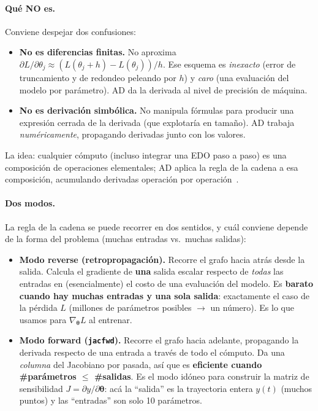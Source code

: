 \documentclass[11pt,a4paper]{article}
\newcommand{\thetavec}{\bm{\theta}}
\begin{document}
\paragraph{Qué NO es.} Conviene despejar dos confusiones:
\begin{itemize}[nosep]
  \item \textbf{No es diferencias finitas.} No aproxima $\partial L/\partial\theta_j \approx (L(\theta_j+h)-L(\theta_j))/h$. Ese esquema es \emph{inexacto} (error de truncamiento y de redondeo peleando por $h$) y \emph{caro} (una evaluación del modelo por parámetro). AD da la derivada al nivel de precisión de máquina.
  \item \textbf{No es derivación simbólica.} No manipula fórmulas para producir una expresión cerrada de la derivada (que explotaría en tamaño). AD trabaja \emph{numéricamente}, propagando derivadas junto con los valores.
\end{itemize}
La idea: cualquier cómputo (incluso integrar una EDO paso a paso) es una composición de operaciones elementales; AD aplica la regla de la cadena a esa composición, acumulando derivadas operación por operación~\cite{baydin2018}.

\paragraph{Dos modos.} La regla de la cadena se puede recorrer en dos sentidos, y cuál conviene depende de la forma del problema (muchas entradas vs.\ muchas salidas):
\begin{itemize}[nosep]
  \item \textbf{Modo reverse (retropropagación).} Recorre el grafo hacia atrás desde la salida. Calcula el gradiente de \textbf{una} salida escalar respecto de \emph{todas} las entradas en (esencialmente) el costo de una evaluación del modelo. Es \textbf{barato cuando hay muchas entradas y una sola salida}: exactamente el caso de la pérdida $L$ (millones de parámetros posibles $\to$ un número). Es lo que usamos para $\nabla_{\thetavec}L$ al entrenar.
  \item \textbf{Modo forward (\texttt{jacfwd}).} Recorre el grafo hacia adelante, propagando la derivada respecto de una entrada a través de todo el cómputo. Da una \emph{columna} del Jacobiano por pasada, así que es \textbf{eficiente cuando \#parámetros $\le$ \#salidas}. Es el modo idóneo para construir la matriz de sensibilidad $J=\partial y/\partial\thetavec$: acá la ``salida'' es la trayectoria entera $y(t)$ (muchos puntos) y las ``entradas'' son solo 10 parámetros.
\end{itemize}
\end{document}
